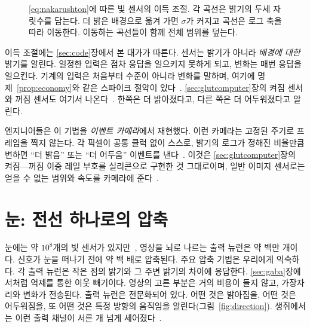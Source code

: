 \begin{figure}[t]
\centering
{}
\caption{\eqref{eq:nakarushton}에 따른 빛 센서의 이득 조절. 각 곡선은 밝기의 두세 자릿수를 담는다. 더 밝은 배경으로 옮겨 가면 $\sigma$가 커지고 곡선은 로그 축을 따라 이동한다. 이동하는 곡선들이 함께 전체 범위를 덮는다.}
\label{fig:adaptation}
\end{figure}

이득 조절에는 \ref{sec:code}장에서 본 대가가 따른다. 센서는 밝기가 아니라 \emph{배경에 대한} 밝기를 알린다. 일정한 입력은 점차 응답을 일으키지 못하게 되고, 변화는 매번 응답을 일으킨다. 기계의 입력은 처음부터 수준이 아니라 변화를 말하며, 여기에 명제~\ref{prop:economy}와 같은 스파이크 절약이 있다~\cite{Barlow1961}. \ref{sec:glutcomputer}장의 켜짐 센서와 꺼짐 센서도 여기서 나온다~\cite{Schiller1992}. 한쪽은 더 밝아졌다고, 다른 쪽은 더 어두워졌다고 알린다.

엔지니어들은 이 기법을 \emph{이벤트 카메라}에서 재현했다. 이런 카메라는 고정된 주기로 프레임을 찍지 않는다. 각 픽셀이 공통 클럭 없이 스스로, 밝기의 로그가 정해진 비율만큼 변하면 “더 밝음” 또는 “더 어두움” 이벤트를 낸다~\cite{Lichtsteiner2008}. 이것은 \ref{sec:glutcomputer}장의 켜짐---꺼짐 이중 레일 부호를 실리콘으로 구현한 것 그대로이며, 일반 이미지 센서로는 얻을 수 없는 범위와 속도를 카메라에 준다~\cite{Gallego2022}.

\section{눈: 전선 하나로의 압축}

눈에는 약 $10^8$개의 빛 센서가 있지만~\cite{Curcio1990}, 영상을 뇌로 나르는 출력 뉴런은 약 백만 개이다. 신호가 눈을 떠나기 전에 약 백 배로 압축된다. 주요 압축 기법은 우리에게 익숙하다. 각 출력 뉴런은 작은 점의 밝기와 그 주변 밝기의 차이에 응답한다. \ref{sec:gaba}장에서처럼 억제를 통한 이웃 빼기이다. 영상의 고른 부분은 거의 비용이 들지 않고, 가장자리와 변화가 전송된다. 출력 뉴런은 전문화되어 있다. 어떤 것은 밝아짐을, 어떤 것은 어두워짐을, 또 어떤 것은 특정 방향의 움직임을 알린다(그림~\ref{fig:direction}). 생쥐에서는 이런 출력 채널이 서른 개 넘게 세어졌다~\cite{Baden2016}.

